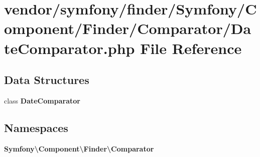\section{vendor/symfony/finder/\+Symfony/\+Component/\+Finder/\+Comparator/\+Date\+Comparator.php File Reference}
\label{_date_comparator_8php}
\subsection*{Data Structures}
\begin{DoxyCompactItemize}
\item 
class {\bf Date\+Comparator}
\end{DoxyCompactItemize}
\subsection*{Namespaces}
\begin{DoxyCompactItemize}
\item 
 {\bf Symfony\textbackslash{}\+Component\textbackslash{}\+Finder\textbackslash{}\+Comparator}
\end{DoxyCompactItemize}
